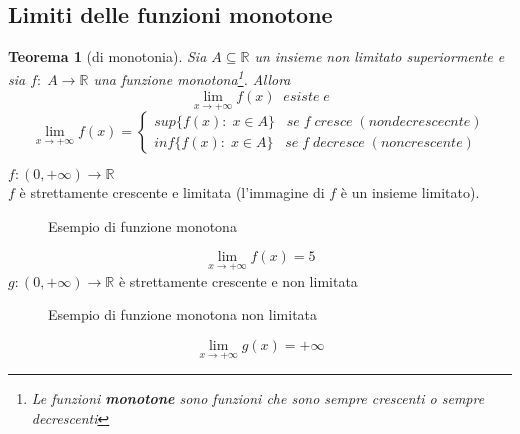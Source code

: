 \documentclass[a4paper]{article}
\newtheorem{theorem}{Teorema}
\theoremstyle{break}
\theoremstyle{break}
\theoremstyle{break}
\theoremstyle{break}
\begin{document}
\subsection{Limiti delle funzioni monotone}
\begin{theorem}[di monotonia]
  Sia \( A \subseteq \mathbb{R}\) un insieme non limitato superiormente e sia \( f:\;A \to \mathbb{R} \)
  una funzione monotona\footnote{Le funzioni \textbf{monotone} sono funzioni che
  sono sempre crescenti o sempre decrescenti}. Allora
  \[
    \lim_{x \to +\infty} f(x)\;\;esiste\;e
  \]
  \[
    \lim_{x \to +\infty} f(x) =
    \begin{cases}
      sup\{ f(x):\; x \in A \}\;\;\; se\;f\;cresce\;(non decrescecnte) \\
      inf\{ f(x):\; x \in A \}\;\;\; se\;f\;decresce\;(non crescente)
    \end{cases}
  \]
\end{theorem}
\( f: (0, +\infty) \to \mathbb{R} \)\\
\( f \) è strettamente crescente e limitata (l'immagine di \( f \) è un insieme limitato).

\begin{figure}[H]
  \begin{center}
  \end{center}
  \caption{Esempio di funzione monotona}
\end{figure}
\[
  \lim_{x \to +\infty} f(x) = 5
\]
\( g: (0,+\infty) \to \mathbb{R}\) è strettamente crescente e non limitata
\begin{figure}[H]
  \begin{center}
  \end{center}
  \caption{Esempio di funzione monotona non limitata}
\end{figure}
\[
  \lim_{x \to +\infty} g(x) = +\infty
\]
\vspace{1cm}
\end{document}
